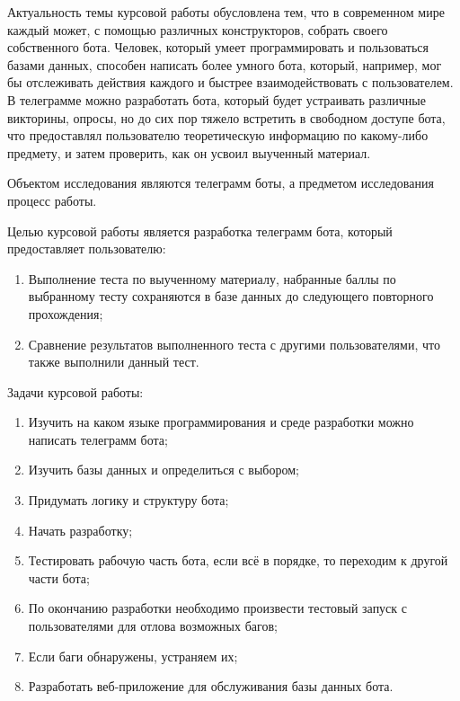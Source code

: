 \documentclass[12pt, oldlfont, amsfonts]{report}
\begin{document}
Актуальность темы курсовой работы обусловлена тем, что в современном мире каждый может, с помощью различных конструкторов, собрать своего собственного бота. Человек, который умеет программировать и пользоваться базами данных, способен написать более умного бота, который, например, мог бы отслеживать действия каждого и быстрее взаимодействовать с пользователем. В телеграмме можно разработать бота, который будет устраивать различные викторины, опросы, но до сих пор тяжело встретить в свободном доступе бота, что предоставлял пользователю теоретическую информацию по какому-либо предмету, и затем проверить, как он усвоил выученный материал. 
	
Объектом исследования являются телеграмм боты, а предметом исследования процесс работы.

Целью курсовой работы является разработка телеграмм бота, который предоставляет пользователю: 
\begin{enumerate}
\item Выполнение теста по выученному материалу, набранные баллы по выбранному тесту сохраняются в базе данных до следующего повторного прохождения;
\item 	Сравнение результатов выполненного теста с другими пользователями, что также выполнили данный тест.
\end{enumerate}
	
Задачи курсовой работы:
\begin{enumerate}
\item Изучить на каком языке программирования и среде разработки можно написать телеграмм бота;
\item Изучить базы данных и определиться с выбором;
\item Придумать логику и структуру бота;
\item Начать разработку;
\item Тестировать рабочую часть бота, если всё в порядке, то переходим к другой части бота;
\item По окончанию разработки необходимо произвести тестовый запуск с пользователями для отлова возможных багов;
\item Если баги обнаружены, устраняем их;
\item Разработать веб-приложение для обслуживания базы данных бота.
\end{enumerate}

\setcounter{section}{0}
\setcounter{subsection}{0}
\setcounter{subsubsection}{0}
\setcounter{equation}{0}
\setcounter{section}{0}
\end{document}
